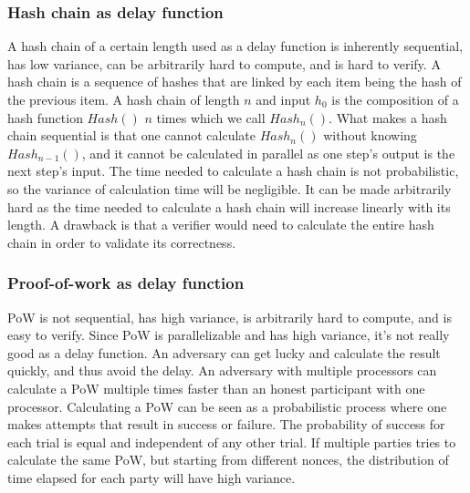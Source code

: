 \subsubsection{Hash chain as delay function}
A hash chain of a certain length used as a delay function is inherently sequential, has low variance, can be arbitrarily hard to compute, and is hard to verify. A hash chain is a sequence of hashes that are linked by each item being the hash of the previous item. A hash chain of length $n$ and input $h_0$ is the composition of a hash function $Hash()$ $n$ times which we call $Hash_n()$. What makes a hash chain sequential is that one cannot calculate $Hash_n()$ without knowing $Hash_{n-1}()$, and it cannot be calculated in parallel as one step's output is the next step's input. The time needed to calculate a hash chain is not probabilistic, so the variance of calculation time will be negligible. It can be made arbitrarily hard as the time needed to calculate a hash chain will increase linearly with its length. A drawback is that a verifier would need to calculate the entire hash chain in order to validate its correctness. 

\subsubsection{Proof-of-work as delay function}
PoW is not sequential, has high variance, is arbitrarily hard to compute, and is easy to verify. Since PoW is parallelizable and has high variance, it's not really good as a delay function. An adversary can get lucky and calculate the result quickly, and thus avoid the delay. An adversary with multiple processors can calculate a PoW multiple times faster than an honest participant with one processor. Calculating a PoW can be seen as a probabilistic process where one makes attempts that result in success or failure. The probability of success for each trial is equal and independent of any other trial. If multiple parties tries to calculate the same PoW, but starting from different nonces, the distribution of time elapsed for each party will have high variance.  

